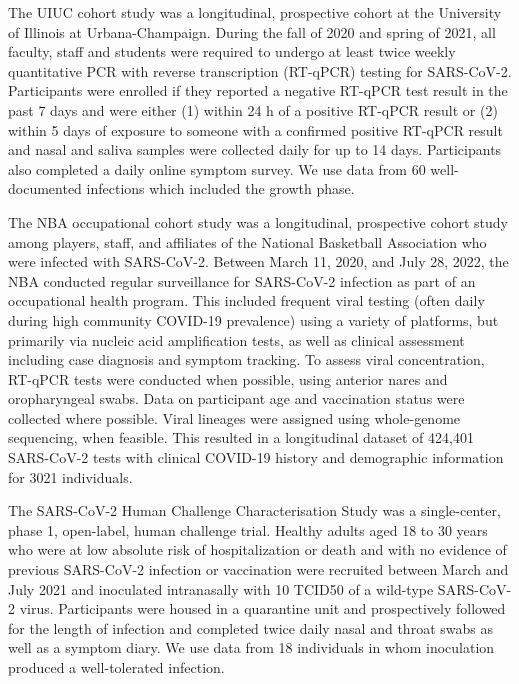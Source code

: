 \documentclass[11pt]{article}
\begin{document}
The UIUC cohort study was a longitudinal, prospective cohort at the University of Illinois at Urbana-Champaign. During the fall of 2020 and spring of 2021, all faculty, staff and students were required to undergo at least twice weekly quantitative PCR with reverse transcription (RT-qPCR) testing for SARS-CoV-2. Participants were enrolled if they reported a negative RT-qPCR test result in the past 7 days and were either (1) within 24 h of a positive RT-qPCR result or (2) within 5 days of exposure to someone with a confirmed positive RT-qPCR result and nasal and saliva samples were collected daily for up to 14 days. Participants also completed a daily online symptom survey. We use data from 60 well-documented infections which included the growth phase.

The NBA occupational cohort study was a longitudinal, prospective cohort study among players, staff, and affiliates of the National Basketball Association who were infected with SARS-CoV-2. Between March 11, 2020, and July 28, 2022, the NBA conducted regular surveillance for SARS-CoV-2 infection as part of an occupational health program. This included frequent viral testing (often daily during high community COVID-19 prevalence) using a variety of platforms, but primarily via nucleic acid amplification tests, as well as clinical assessment including case diagnosis and symptom tracking. To assess viral concentration, RT-qPCR tests were conducted when possible, using anterior nares and oropharyngeal swabs. Data on participant age and vaccination status were collected where possible. Viral lineages were assigned using whole-genome sequencing, when feasible. This resulted in a longitudinal dataset of 424,401 SARS-CoV-2 tests with clinical COVID-19 history and demographic information for 3021 individuals.

The SARS-CoV-2 Human Challenge Characterisation Study was a single-center, phase 1, open-label, human challenge trial. Healthy adults aged 18 to 30 years who were at low absolute risk of hospitalization or death and with no evidence of previous SARS-CoV-2 infection or vaccination were recruited between March and July 2021 and inoculated intranasally with 10 TCID50 of a wild-type SARS-CoV-2 virus. Participants were housed in a quarantine unit and prospectively followed for the length of infection and completed twice daily nasal and throat swabs as well as a symptom diary. We use data from 18 individuals in whom inoculation produced a well-tolerated infection. 
\end{document}
